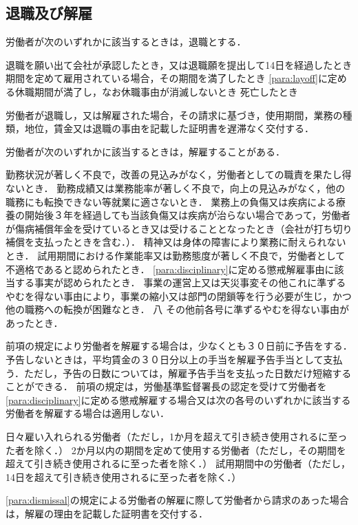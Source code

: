 \documentclass[11pt,a4paper]{jsarticle}
\begin{document}
\subsection{退職及び解雇}

労働者が次のいずれかに該当するときは，退職とする．
\begin{enumerate}
	\itm 退職を願い出て会社が承認したとき，又は退職願を提出して14日を経過したとき
	\itm 期間を定めて雇用されている場合，その期間を満了したとき
	\itm \ref{para:layoff}に定める休職期間が満了し，なお休職事由が消滅しないとき
	\itm 死亡したとき
\end{enumerate}
\term
労働者が退職し，又は解雇された場合，その請求に基づき，使用期間，業務の種類，地位，賃金又は退職の事由を記載した証明書を遅滞なく交付する．

労働者が次のいずれかに該当するときは，解雇することがある．
\label{para:dismissal}
\begin{enumerate}
	\itm 勤務状況が著しく不良で，改善の見込みがなく，労働者としての職責を果たし得ないとき．
	\itm 勤務成績又は業務能率が著しく不良で，向上の見込みがなく，他の職務にも転換できない等就業に適さないとき．
	\itm 業務上の負傷又は疾病による療養の開始後３年を経過しても当該負傷又は疾病が治らない場合であって，労働者が傷病補償年金を受けているとき又は受けることとなったとき（会社が打ち切り補償を支払ったときを含む．）．
	\itm 精神又は身体の障害により業務に耐えられないとき．
	\itm 試用期間における作業能率又は勤務態度が著しく不良で，労働者として不適格であると認められたとき．
	\itm \ref{para:disciplinary}に定める懲戒解雇事由に該当する事実が認められたとき．
	\itm 事業の運営上又は天災事変その他これに準ずるやむを得ない事由により，事業の縮小又は部門の閉鎖等を行う必要が生じ，かつ他の職務への転換が困難なとき．
	\itm 八	その他前各号に準ずるやむを得ない事由があったとき．
\end{enumerate}
\term
前項の規定により労働者を解雇する場合は，少なくとも３０日前に予告をする．予告しないときは，平均賃金の３０日分以上の手当を解雇予告手当として支払う．ただし，予告の日数については，解雇予告手当を支払った日数だけ短縮することができる．
\term
前項の規定は，労働基準監督署長の認定を受けて労働者を\ref{para:disciplinary}に定める懲戒解雇する場合又は次の各号のいずれかに該当する労働者を解雇する場合は適用しない．
\begin{enumerate}
	\itm 日々雇い入れられる労働者（ただし，1か月を超えて引き続き使用されるに至った者を除く．）
	\itm 2か月以内の期間を定めて使用する労働者（ただし，その期間を超えて引き続き使用されるに至った者を除く．）
	\itm 試用期間中の労働者（ただし，14日を超えて引き続き使用されるに至った者を除く．）
\end{enumerate}
\term
\ref{para:dismissal}の規定による労働者の解雇に際して労働者から請求のあった場合は，解雇の理由を記載した証明書を交付する．
\end{document}
